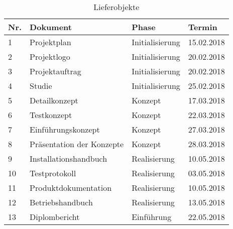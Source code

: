 \begin{table}[H]
\begin{tabular}[t]{p{0.5cm}p{6.5cm}p{6.5cm}p{1.8cm}}
\hline
\rowcolor{heading}\textbf{Nr.} & \textbf{Dokument} & \textbf{Phase} & \textbf{Termin} \\\hline
1 & Projektplan & Initialisierung & 15.02.2018 \\\hline
2 & Projektlogo & Initialisierung & 20.02.2018 \\\hline
3 & Projektauftrag & Initialisierung & 20.02.2018 \\\hline
4 & Studie & Initialisierung & 25.02.2018 \\\hline
5 & Detailkonzept & Konzept & 17.03.2018 \\\hline
6 & Testkonzept & Konzept & 22.03.2018 \\\hline
7 & Einführungskonzept & Konzept & 27.03.2018 \\\hline
8 & Präsentation der Konzepte & Konzept & 28.03.2018 \\\hline
9 & Installationshandbuch & Realisierung & 10.05.2018 \\\hline
10 & Testprotokoll & Realisierung & 03.05.2018 \\\hline
11 & Produktdokumentation & Realisierung & 10.05.2018 \\\hline
12 & Betriebshandbuch & Realisierung & 13.05.2018 \\\hline
13 & Diplombericht & Einführung & 22.05.2018 \\\hline

\end{tabular}
\caption{Lieferobjekte}
\end{table}


 
